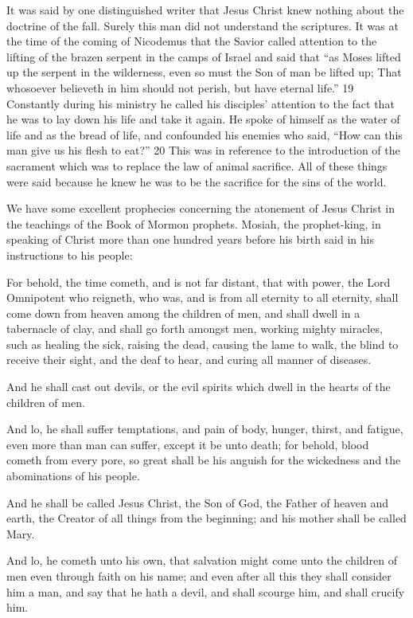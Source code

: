 It was said by one distinguished writer that Jesus Christ knew nothing about the doctrine of
the fall. Surely this man did not understand the scriptures. It was at the time of the coming of
Nicodemus that the Savior called attention to the lifting of the brazen serpent in the camps of
Israel and said that ``as Moses lifted up the serpent in the wilderness, even so must the Son of
man be lifted up; That whosoever believeth in him should not perish, but have eternal life.''
19 Constantly during his ministry he called his disciples' attention to the fact that he was to
lay down his life and take it again. He spoke of himself as the water of life and as the bread
of life, and confounded his enemies who said, ``How can this man give us his flesh to eat?''
20 This was in reference to the introduction of the sacrament which was to replace the law of
animal sacrifice. All of these things were said because he knew he was to be the sacrifice for
the sins of the world.

We have some excellent prophecies concerning the atonement of Jesus Christ in the
teachings of the Book of Mormon prophets. Mosiah, the prophet-king, in speaking of Christ
more than one hundred years before his birth said in his instructions to his people:

For behold, the time cometh, and is not far distant, that with power, the Lord Omnipotent
who reigneth, who was, and is from all eternity to all eternity, shall come down from heaven
among the children of men, and shall dwell in a tabernacle of clay, and shall go forth
amongst men, working mighty miracles, such as healing the sick, raising the dead, causing
the lame to walk, the blind to receive their sight, and the deaf to hear, and curing all manner
of diseases.

And he shall cast out devils, or the evil spirits which dwell in the hearts of the children of
men.

And lo, he shall suffer temptations, and pain of body, hunger, thirst, and fatigue, even more
than man can suffer, except it be unto death; for behold, blood cometh from every pore, so
great shall be his anguish for the wickedness and the abominations of his people.

And he shall be called Jesus Christ, the Son of God, the Father of heaven and earth, the
Creator of all things from the beginning; and his mother shall be called Mary.

And lo, he cometh unto his own, that salvation might come unto the children of men even
through faith on his name; and even after all this they shall consider him a man, and say that
he hath a devil, and shall scourge him, and shall crucify him.

